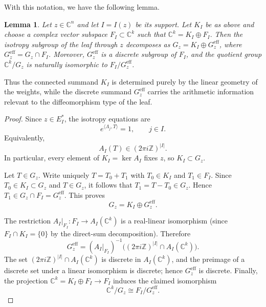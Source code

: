 \documentclass[11pt]{amsart}
\newtheorem{lemma}[theorem]{Lemma}
\theoremstyle{definition}
\theoremstyle{remark}
\newcommand{\Z}{\mathbb{Z}}
\newcommand{\C}{\mathbb{C}}
\newcommand{\strat}[1]{E_{#1}}
\newcommand{\stratSS}[1]{E_{#1}^*}
\newcommand{\stratS}[1]{\stratSS{#1}}
\begin{document}
With this notation, we have the following lemma.

\begin{lemma}\label{lem:isotropy-splitting}
	Let $z\in\C^n$ and let $I=I(z)$ be its support.
	Let $ K_I $ be as above and choose a complex vector subspace $F_I\subset\C^k$ such that $\C^k=K_I\oplus F_I.$
	Then the isotropy subgroup of the leaf through $z$ decomposes as $G_z = K_I\oplus G_z^{\mathrm{eff}}$, where $G_z^{\mathrm{eff}} = G_z\cap F_I$.
	Moreover, $G_z^{\mathrm{eff}}$ is a discrete subgroup of $F_I$, and the quotient group $\C^k/G_z$ is naturally isomorphic to $F_I/G_z^{\mathrm{eff}}$.
\end{lemma}

Thus the connected summand $K_I$ is determined purely by the linear geometry of the weights, while the discrete summand $G_z^{\mathrm{eff}}$ carries the arithmetic information relevant to the diffeomorphism type of the leaf.

\begin{proof}
	Since $z\in \stratS{I}$, the isotropy equations are 
	$$ 
		e^{\langle\Lambda_j,T\rangle}=1, \qquad j\in I.
	$$
	Equivalently,
	$$
		A_I(T)\in (2\pi i\Z)^{|I|}.
	$$
	In particular, every element of $K_I=\ker A_I$ fixes $z$, so $K_I\subset G_z$.

	Let $T\in G_z$.
	Write uniquely $T=T_0+T_1$ with $T_0\in K_I$ and $T_1\in F_I$.
	Since $T_0\in K_I\subset G_z$ and $T\in G_z$, it follows that $T_1=T-T_0\in G_z$.
	Hence $T_1\in G_z\cap F_I=G_z^{\mathrm{eff}}$.
	This proves 
	$$ 
		G_z=K_I\oplus G_z^{\mathrm{eff}}.
	$$

	The restriction $A_I|_{F_I}:F_I\to A_I(\C^k)$ is a real-linear isomorphism (since $F_I\cap K_I=\{0\}$ by the direct-sum decomposition).
	Therefore 
	$$ 
		G_z^{\mathrm{eff}} = (A_I|_{F_I})^{-1}\big((2\pi i\Z)^{|I|} \cap A_I(\C^k)\big).
	$$
	The set $(2\pi i\Z)^{|I|}\cap A_I(\C^k)$ is discrete in $A_I(\C^k)$, and the preimage of a discrete set under a linear isomorphism is discrete; hence $G_z^{\mathrm{eff}}$ is discrete.
	Finally, the projection $\C^k=K_I\oplus F_I\to F_I$ induces the claimed isomorphism 
	$$ 
		\C^k/G_z\cong F_I/G_z^{\mathrm{eff}}.
	$$
\end{proof}
\end{document}
